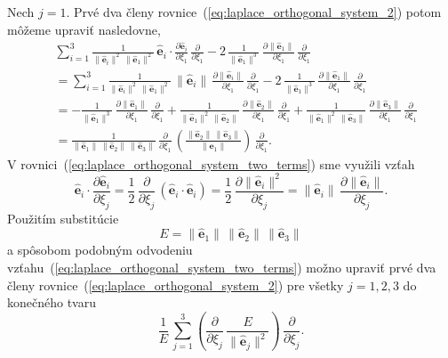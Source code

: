 \documentclass[a4paper,12pt]{book}
\let\vec\mathbf
\begin{document}
Nech $j = 1$.  Prvé dva členy rovnice~(\ref{eq:laplace_orthogonal_system_2}) 
potom môžeme upraviť nasledovne,
%
\begin{equation}
\label{eq:laplace_orthogonal_system_two_terms}
\begin{split}
&\sum_{i = 1}^{3} \frac{1}{\| \hat{\vec e}_i \|^2 \, \| \hat{\vec e}_1 \|^2} \, 
\hat{\vec e}_i \cdot \frac{\partial \hat{\vec e}_i}{\partial \xi_1} \, 
\frac{\partial}{\partial \xi_1}
- 2\, \frac{1}{\|\hat{\vec e}_1 \|^3} \, \frac{\partial \| \hat{\vec e}_1 
\|}{\partial \xi_1} \, \frac{\partial}{\partial \xi_1}\\
%
&= \sum_{i = 1}^{3} \frac{1}{\| \hat{\vec e}_i \|^2 \, \| \hat{\vec e}_1 \|^2} 
\, \| \hat{\vec e}_i \| \, \frac{\partial \| \hat{\vec e}_i \|}{\partial \xi_1} 
\, \frac{\partial}{\partial \xi_1}
- 2\, \frac{1}{\|\hat{\vec e}_1 \|^3} \, \frac{\partial \| \hat{\vec e}_1 
\|}{\partial \xi_1} \, \frac{\partial}{\partial \xi_1}\\
%
&= -\frac{1}{\| \hat{\vec e}_1 \|^3} \, \frac{\partial \| \hat{\vec e}_1 
\|}{\partial \xi_1} \, \frac{\partial}{\partial \xi_1} + \frac{1}{\| \hat{\vec 
e}_1 \|^2 \, \| \hat{\vec e}_2 \|} \, \frac{\partial \| \hat{\vec e}_2 
\|}{\partial \xi_1} \, \frac{\partial}{\partial \xi_1} + \frac{1}{\| \hat{\vec 
e}_1 \|^2 \, \| \hat{\vec e}_3 \|} \, \frac{\partial \| \hat{\vec e}_3 
\|}{\partial \xi_1} \, \frac{\partial}{\partial \xi_1}\\
%
&= \frac{1}{\| \hat{\vec e}_1 \| \, \| \hat{\vec e}_2 \| \, \| \hat{\vec e}_3 
\|} \, \frac{\partial}{\partial \xi_1} \, \left( \frac{\| \hat{\vec e}_2 \| \, 
\| \hat{\vec e}_3 \|}{\| \hat{\vec e}_1 \|} \right) \, \frac{\partial}{\partial 
\xi_1}{.}
\end{split}
\end{equation}
%
V rovnici~(\ref{eq:laplace_orthogonal_system_two_terms}) sme využili vzťah
%
\begin{equation}
\hat{\vec e}_i \cdot \frac{\partial \hat{\vec e}_i}{\partial \xi_j} 
= \frac{1}{2} \, \frac{\partial}{\partial \xi_j} \, \left( \hat{\vec e}_i \cdot 
\hat{\vec e}_i \right) = \frac{1}{2} \, \frac{\partial \| \hat{\vec e}_i 
\|^2}{\partial \xi_j} = \| \hat{\vec e}_i \| \, \frac{\partial \| \hat{\vec 
e}_i \|}{\partial \xi_j}{.}
\end{equation}
%
Použitím substitúcie
%
\begin{equation}
\label{eq:e_laplace}
E = \| \hat{\vec e}_1  \| \, \| \hat{\vec e}_2  \| \, \| \hat{\vec e}_3  \|
\end{equation}
%
a spôsobom podobným odvodeniu 
vzťahu~(\ref{eq:laplace_orthogonal_system_two_terms}) možno upraviť prvé dva 
členy rovnice~(\ref{eq:laplace_orthogonal_system_2}) pre všetky $j = 1, 2, 3$ 
do konečného tvaru
%
\begin{equation}
\label{eq:laplace_orthogonal_system_two_terms_final}
\frac{1}{E} \, \sum_{j = 1}^3 \left( \frac{\partial}{\partial \xi_j} \, 
\frac{E}{\| \hat{\vec e}_j \|^2}\right) \, \frac{\partial}{\partial \xi_j}{.}
\end{equation}
\end{document}
